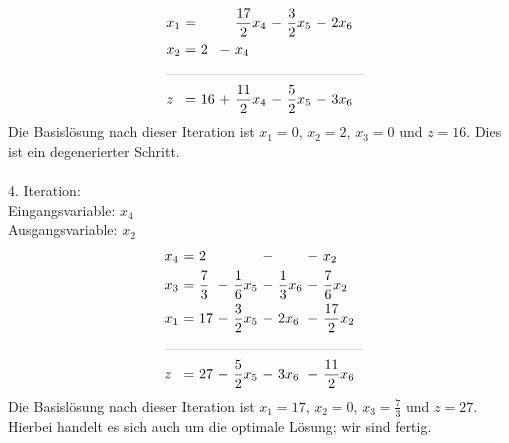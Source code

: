 \documentclass [a4paper,11pt]{article}
\begin{document}
\begin{enumerate}
\begin{align*}
\begin{alignedat}{6}
        & x_1 &\ = &     &    &\ \frac{17}{2}x_4 &\ - &\ \frac{3}{2}x_5 &\ - &\ 2x_6 \\
        & x_2 &\ = &\  2 &\ - &\             x_4 &    &        &    & \\
        &\rlap{\rule{5cm}{.1pt}} &&&&&&&&\\
        & z   &\ = &\ 16 &\ + &\ \frac{11}{2}x_4 &\ - &\ \frac{5}{2}x_5 &\ - &\ 3x_6
        \end{alignedat}
        \end{align*}
        Die Basislösung nach dieser Iteration ist $x_1 = 0$, $x_2 = 2$, $x_3 = 0$ und $z = 16$. Dies ist ein degenerierter Schritt.\\
        \\
        4. Iteration:\\
        Eingangsvariable: $x_4$\\
        Ausgangsvariable: $x_2$
        \begin{align*}
        \begin{alignedat}{6}
        & x_4 &\ = &\           2 &    &                 &\ - &\                &\ - &\ x_2 \\
        & x_3 &\ = &\ \frac{7}{3} &\ - &\ \frac{1}{6}x_5 &\ - &\ \frac{1}{3}x_6 &\ - &\  \frac{7}{6}x_2 \\
        & x_1 &\ = &\          17 &\ - &\ \frac{3}{2}x_5 &\ - &\           2x_6 &\ - &\ \frac{17}{2}x_2 \\
        &\rlap{\rule{5cm}{.1pt}} &&&&&&&&\\
        & z   &\ = &\ 27 &\ - &\ \frac{5}{2}x_5 &\ - &\ 3x_6 &\ - &\ \frac{11}{2}x_6
        \end{alignedat}
        \end{align*}
        Die Basislösung nach dieser Iteration ist $x_1 = 17$, $x_2 = 0$, $x_3 = \frac{7}{3}$ und $z = 27$.\\
        Hierbei handelt es sich auch um die optimale Lösung; wir sind fertig.

    \end{enumerate}
\end{document}
